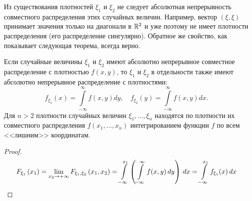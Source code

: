 \begin{rmrk}
    Из существования плотностей $\xi_1$ и $\xi_2$ не следует абсолютная непрерывность совместного распределения этих случайных величин. 
    Например, вектор $(\xi, \xi)$ принимает значения только на диагонали в $\mathbb{R}^2$ и уже поэтому не имеет плотности распределения (его распределение сингулярно). 
    Обратное же свойство, как показывает следующая теорема, всегда верно.
\end{rmrk}

\begin{thm*}
    Если случайные величины $\xi_1$ и $\xi_2$ имеют абсолютно непрерывное совместное распределение с плотностью $f(x, y)$, то $\xi_1$ и $\xi_2$ в отдельности также имеют абсолютно непрерывное распределение с плотностями:
    \begin{equation*}
        f_{\xi_{1}}(x)=\int\limits_{-\infty}^{\infty} f(x, y) dy, \quad f_{\xi_{2}}(y)=\int\limits_{-\infty}^{\infty} f(x, y) dx.
    \end{equation*}
    Для $n > 2$ плотности случайных величин $\xi_1, \ldots, \xi_n$ находятся по плотности их совместного распределения $f(x_1, \ldots, x_n)$ интегрированием функции $f$ по всем <<лишним>> координатам.
\end{thm*}
\begin{proof}
\begin{equation*}
    F_{\xi_{1}}\left(x_{1}\right)
    = \lim _{x_{2} \to+\infty} F_{\xi_{1}, \xi_{2}}\left(x_{1}, x_{2}\right)
    = \int\limits_{-\infty}^{x_{1}}\left(\int\limits_{-\infty}^{\infty} f(x, y) \,d y\right) \,d x
    = \int\limits_{-\infty}^{x_{1}} f_{\xi_{1}}(x) \,d x \qedhere
\end{equation*}
\end{proof}

